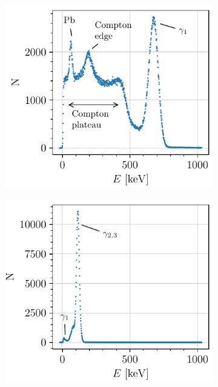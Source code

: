 \begin{figure}[htbp]
    \centering
    \begin{subfigure}{0.495\textwidth}
        \includegraphics[scale=1]{figures/cs137_spectrum.pdf}
        \caption{}
    \end{subfigure}
    \hfill
    \begin{subfigure}{0.495\textwidth}
        \includegraphics[scale=1]{figures/co57_spectrum.pdf}
        \caption{}
    \end{subfigure}
    \begin{subfigure}{0.495\textwidth}

\end{subfigure}
\end{figure}
